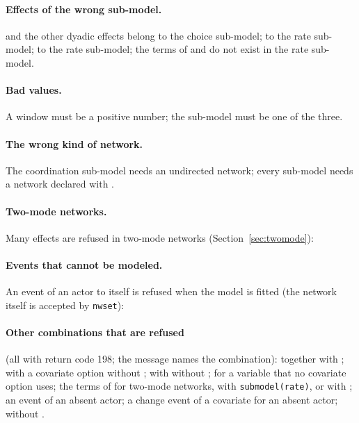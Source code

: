 \paragraph{Effects of the wrong sub-model.}  and the other dyadic effects belong to the choice sub-model;  to the rate sub-model;  to the rate sub-model; the terms of  and  do not exist in the rate sub-model.

\paragraph{Bad values.} A window must be a positive number; the sub-model must be one of the three.

\paragraph{The wrong kind of network.} The coordination sub-model needs an undirected network; every sub-model needs a network declared with .

\paragraph{Two-mode networks.} Many effects are refused in two-mode networks (Section~\ref{sec:twomode}):

\paragraph{Events that cannot be modeled.} An event of an actor to itself is refused when the model is fitted (the network itself is accepted by \texttt{nwset}):

\paragraph{Other combinations that are refused} (all with return code 198; the message names the combination):  together with ;  with a covariate option without ;  with  without ;  for a variable that no covariate option uses; the terms of  for two-mode networks, with \texttt{submodel(rate)}, or with ; an event of an absent actor; a change event of a covariate for an absent actor;  without .

